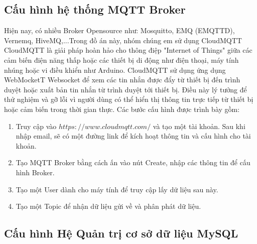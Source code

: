 \subsection{Cấu hình hệ thống MQTT Broker}
Hiện nay, có nhiều Broker Opensource như: Mosquitto, EMQ (EMQTTD), Vernemq, HiveMQ,...Trong đồ án này, nhóm chúng em sử dụng CloudMQTT \\
CloudMQTT là giải pháp hoàn hảo cho thông điệp "Internet of Things" giữa các cảm biến điện năng thấp hoặc các thiết bị di động như điện thoại, máy tính nhúng hoặc vi điều khiển như Arduino. CloudMQTT sử dụng ứng dụng WebMocketT Websocket để xem các tin nhắn được đẩy từ thiết bị đến trình duyệt hoặc xuất bản tin nhắn từ trình duyệt tới thiết bị. Điều này lý tưởng để thử nghiệm và gỡ lỗi vì người dùng có thể hiển thị thông tin trực tiếp từ thiết bị hoặc cảm biến trong thời gian thực.
Các bước cấu hình được trình bày gồm:
\begin{enumerate}
\item Truy cập vào $https://www.cloudmqtt.com/$ và tạo một tài khoản. Sau khi nhập email, sẽ có một đường link để kích hoạt thông tin và cấu hình cho tài khoản.
\item Tạo MQTT Broker bằng cách ấn vào nút Create, nhập các thông tin để cấu hình Broker.
\item Tạo một User dành cho máy tính để truy cập lấy dữ liệu sau này.
\item Tạo một Topic để nhận dữ liệu gửi về và phân phát dữ liệu.
\end{enumerate}

\label{ref{fig4_2}}

\label{ref{fig4_3}}

\label{ref{fig4_4}}

\label{ref{fig4_5}}

\label{ref{fig4_6}}

\label{ref{fig4_7}}
\newpage

\subsection{Cấu hình Hệ Quản trị cơ sở dữ liệu MySQL}

